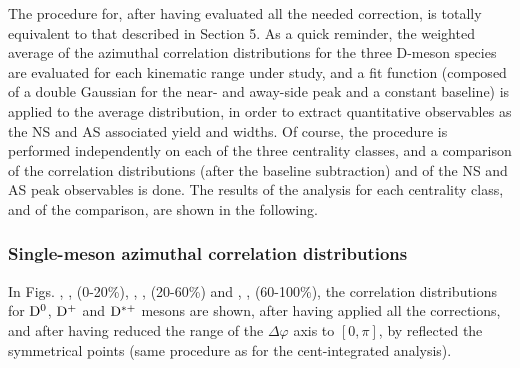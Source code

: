 The procedure for, after having evaluated all the needed correction, is totally equivalent to that described in Section 5.
As a quick reminder, the weighted average of the azimuthal correlation distributions for the three D-meson species are evaluated for each kinematic range under study, and a fit function (composed of a double Gaussian for the near- and away-side peak and a constant baseline) is applied to the average distribution, in order to extract quantitative observables as the NS and AS associated yield and widths.
Of course, the procedure is performed independently on each of the three centrality classes, and a comparison of the correlation distributions (after the baseline subtraction) and of the NS and AS peak observables is done.
The results of the analysis for each centrality class, and of the comparison, are shown in the following.

\subsubsection{Single-meson azimuthal correlation distributions}
In Figs. \label{fig:Dzerocorr020}, \label{fig:Dpluscorr020}, \label{fig:Dstarcorr020} (0-20\%), \label{fig:Dzerocorr2060}, \label{fig:Dpluscorr2060}, \label{fig:Dstarcorr2060} (20-60\%) and \label{fig:Dzerocorr60100}, \label{fig:Dpluscorr60100}, \label{fig:Dstarcorr60100} (60-100\%), the correlation distributions for ${\rm D^0}$, ${\rm D^+}$ and ${\rm D^{*+}}$ mesons are shown, after having applied all the corrections, and after having reduced the range of the $\Delta\varphi$ axis to $[0,\pi]$, by reflected the symmetrical points (same procedure as for the cent-integrated analysis).


